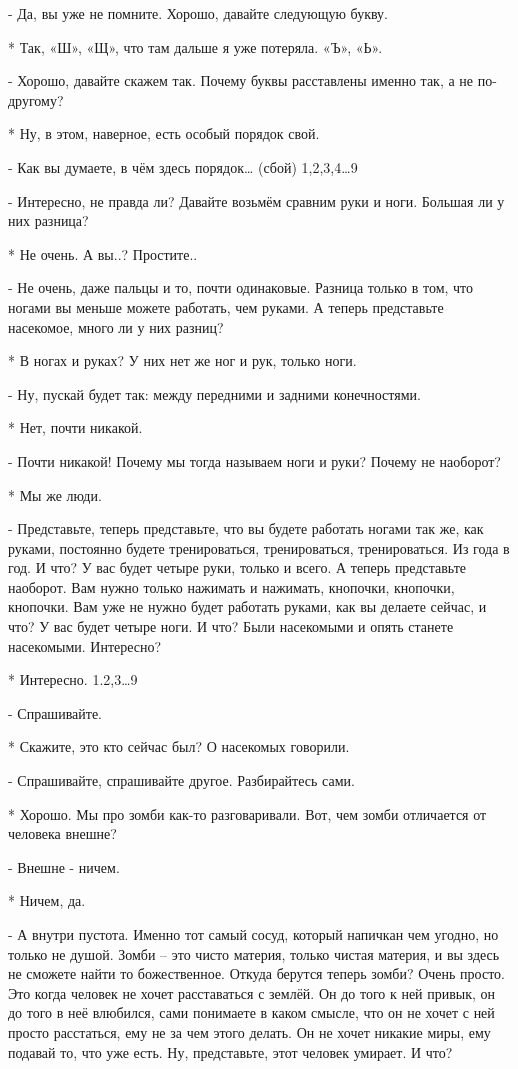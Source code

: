 - Да, вы уже не помните. Хорошо, давайте следующую букву.

* Так, «Ш», «Щ», что там дальше я уже потеряла. «Ъ», «Ь».

- Хорошо, давайте скажем так. Почему буквы расставлены именно так, а не по-другому?

* Ну, в этом, наверное, есть особый порядок свой.

- Как вы думаете, в чём здесь порядок… (сбой)
1,2,3,4…9

- Интересно, не правда ли? Давайте возьмём  сравним руки и ноги. Большая ли у них разница?

* Не очень. А вы..?  Простите..

- Не очень, даже пальцы и то, почти одинаковые. Разница только в том, что ногами вы меньше можете работать, чем руками. А теперь представьте насекомое, много ли у них разниц?

* В ногах и руках? У них нет же ног и рук, только ноги.

- Ну, пускай будет так: между передними и задними конечностями.

* Нет, почти никакой.

- Почти никакой! Почему мы тогда называем ноги и руки? Почему не наоборот?

* Мы же люди.

- Представьте, теперь представьте, что вы будете работать ногами так же, как руками, постоянно будете тренироваться, тренироваться, тренироваться. Из года в год. И что? У вас будет четыре руки, только и всего. А теперь представьте наоборот. Вам нужно только нажимать и нажимать, кнопочки, кнопочки, кнопочки. Вам уже не нужно будет работать руками, как вы делаете сейчас, и что? У вас будет четыре ноги. И что? Были насекомыми и опять  станете насекомыми. Интересно?

* Интересно.
1.2,3…9

- Спрашивайте.

* Скажите, это кто сейчас был? О насекомых говорили.

- Спрашивайте, спрашивайте другое. Разбирайтесь сами.

* Хорошо. Мы про зомби как-то разговаривали. Вот,  чем зомби отличается от человека внешне?

- Внешне - ничем.

* Ничем, да. 

- А внутри пустота. Именно тот самый сосуд, который напичкан чем угодно, но только не душой. Зомби – это чисто материя, только чистая материя,  и вы здесь не сможете найти то божественное. Откуда берутся теперь зомби? Очень просто. Это когда человек не хочет расставаться с землёй. Он до того к ней привык, он до того в неё влюбился, сами понимаете в каком смысле, что он не хочет с ней просто расстаться, ему не за чем этого делать. Он не хочет никакие миры, ему подавай то, что уже есть. Ну, представьте, этот человек умирает. И что? 


